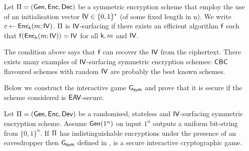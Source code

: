 \begin{defn}
Let $\operatorname{\Pi} = (\operatorname{\mathsf{Gen}},\operatorname{\mathsf{Enc}},\operatorname{\mathsf{Dec}})$ be a symmetric encryption scheme that employ the use of an initialisation vector $\mathsf{IV}\in\{0,1\}^*$ (of some fixed length in n). We write $c\leftarrow\operatorname{\mathsf{Enc}}_{\mathsf{k}}(m;\mathsf{IV})$. $\operatorname{\Pi}$ is $\mathsf{IV}$-surfacing if there exists an efficient algorithm $\operatorname{\mathsf{f}}$ such that $\operatorname{\mathsf{f}}(\operatorname{\mathsf{Enc}}_{\mathsf{k}}(m;\mathsf{IV})) = \mathsf{IV}$ for all $\mathsf{k},m$ and $\mathsf{IV}$. 
\end{defn}

The condition above says that $\operatorname{\mathsf{f}}$ can recover the $\mathsf{IV}$ from the ciphertext. There exists many examples of $\mathsf{IV}$-surfacing symmetric encryption schemes: $\mathsf{CBC}$ flavoured schemes with random $\mathsf{IV}$ are probably the best known schemes. 

Below we construct the interactive game $\operatorname{\mathsf{G}}_{\mathsf{sym}}$ and prove that it is secure if the scheme considered is $\mathsf{EAV}$-secure. 

\begin{thm}
Let $\operatorname{\Pi} = (\operatorname{\mathsf{Gen}},\operatorname{\mathsf{Enc}},\operatorname{\mathsf{Dev}})$ be a randomised, stateless and $\mathsf{IV}$-surfacing symmetric encryption scheme. Assume $\operatorname{\mathsf{Gen}}(1^n)$ on input $1^n$ outputs a uniform bit-string from $\{0,1\}^n$. If $\operatorname{\Pi}$ has indistinguishable encryptions under the presence of an eavesdropper then $\operatorname{\mathsf{G}}_{\mathsf{sym}}$ defined in , is a secure interactive cryptographic game. 
\end{thm}

\begin{comment}

\begin{boxfigGame}{Interactive cryptographic game $\cgame_{\sym}$, which models a ?? game for an $\iv$-surfacing, randomised and stateless symmetric encryption scheme}{symGame}
  \begin{description}

 	\item[\underline{$\dev$}] ~
 	
 		See \figref{symEncDev}. 

	\item[\underline{$\pred(\ptrans,\strans,\sigma)$}] ~
	
		Parse: $\strans = (\cgroup,\order,\generator,b)$ \\
		Parse: $\sigma = \hat{b}$ \\
		If $(\hat{b} = b)$ \Ret $\true$ \\ 
		Else \Ret $\false$
		
	\item[\underline{$(\basep(n), \secf(n)) \defeq \left(\frac{1}{2},2\right)$}]
  \end{description}
\end{boxfigGame}

\end{comment}

